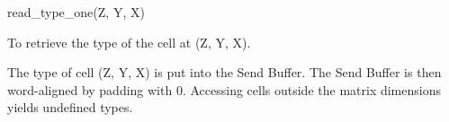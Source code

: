 

\format
read\_type\_one(Z, Y, X)

\purpose

To retrieve the type of the cell at (Z, Y, X).

\description

The type of cell (Z, Y, X) is put into the Send Buffer.
The Send Buffer is then word-aligned by padding with 0.
Accessing cells outside the matrix dimensions yields undefined types.
